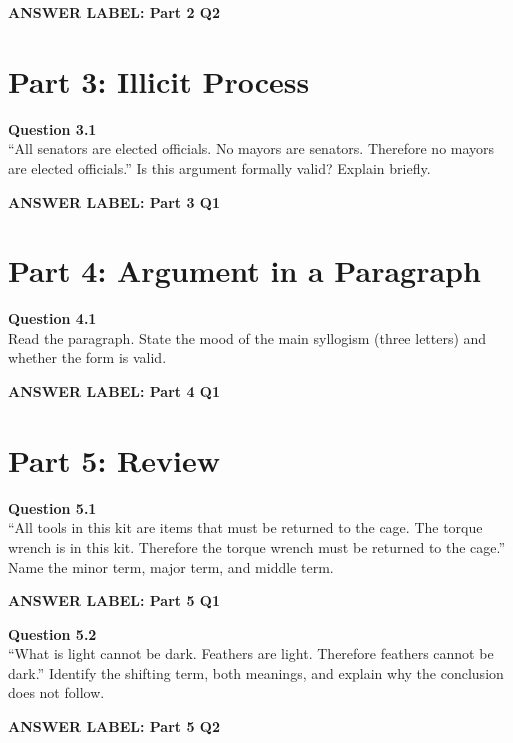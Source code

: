 \documentclass[12pt]{article}
\newcommand{\answerbox}[2]{%
\vspace{0.15em}
\noindent\textbf{#1}\par
\vspace{0.05em}
\noindent\fbox{%
\begin{minipage}[t][#2]{\dimexpr\textwidth-2\fboxsep-2\fboxrule}
\rule{\textwidth}{0pt}
\vspace{#2}
\end{minipage}
}\par
\vspace{0.25em}
}
\begin{document}
\answerbox{ANSWER LABEL: Part 2 Q2}{2.35in}

\newpage

\section*{Part 3: Illicit Process}

\textbf{Question 3.1}\\[-0.15em]
``All senators are elected officials. No mayors are senators. Therefore no mayors are elected officials.'' Is this argument formally valid? Explain briefly.

\answerbox{ANSWER LABEL: Part 3 Q1}{2.45in}

\newpage

\section*{Part 4: Argument in a Paragraph}

\textbf{Question 4.1}\\[-0.15em]
Read the paragraph. State the mood of the main syllogism (three letters) and whether the form is valid.

\vspace{0.2em}

\noindent{}

\answerbox{ANSWER LABEL: Part 4 Q1}{2.35in}

\newpage

\section*{Part 5: Review}

\textbf{Question 5.1}\\[-0.15em]
``All tools in this kit are items that must be returned to the cage. The torque wrench is in this kit. Therefore the torque wrench must be returned to the cage.'' Name the minor term, major term, and middle term.

\answerbox{ANSWER LABEL: Part 5 Q1}{1.85in}

\textbf{Question 5.2}\\[-0.15em]
``What is light cannot be dark. Feathers are light. Therefore feathers cannot be dark.'' Identify the shifting term, both meanings, and explain why the conclusion does not follow.

\answerbox{ANSWER LABEL: Part 5 Q2}{2.35in}
\end{document}
